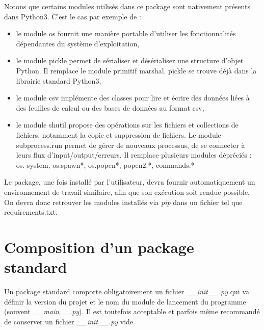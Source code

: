 \documentclass[twoside,a4paper,11pt,frenchb,openany]{report}
\begin{document}
Notons que certains modules utilisés dans ce package sont nativement présents dans Python3. C'est le cas par exemple de :
\begin{itemize}
\item le module os fournit une manière portable d'utiliser les fonctionnalités dépendantes du système d'exploitation,
\item le module pickle permet de sérialiser et désérialiser une structure d'objet Python. Il remplace le module primitif marshal. pickle se trouve déjà dans la librairie standard Python3,
\item le module csv implémente des classes pour lire et écrire des données liées à des feuilles de calcul ou des bases de données au format csv,
\item le module shutil propose des opérations sur les fichiers et collections de fichiers, notamment la copie et suppression de fichiers.
Le module subprocess.run permet de gérer de nouveaux processus, de se connecter à leurs flux d'input/output/erreurs. Il remplace plusieurs modules dépréciés : os. system, os.spawn*, os.popen*, popen2.*, commands.* 
\end{itemize}

Le package, une fois installé par l'utilisateur, devra fournir automatiquement un environnement de travail similaire, afin que son exécution soit rendue possible. On devra donc retrouver les modules installés via \textit{pip} dans un fichier tel que requirements.txt.
 

\section{Composition d'un package standard}

Un package standard comporte obligatoirement un fichier \textit{\_\_init\_\_.py} qui va définir la version du projet et le nom du module de lancement du programme (souvent \textit{\_\_main\_\_.py}). Il est toutefois acceptable et parfois même recommandé de conserver un fichier \textit{\_\_init\_\_.py} vide. 
\end{document}
